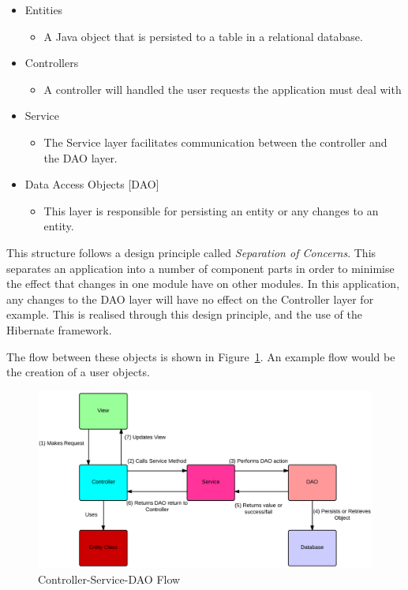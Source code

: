\begin{table}[H]
\begin{itemize}
\item Entities
\begin{itemize}
\item A Java object that is persisted to a table in a relational database.
\end{itemize}
\item Controllers
\begin{itemize}
\item A controller will handled the user requests the application must deal with
\end{itemize}
\item Service
\begin{itemize}
\item The Service layer facilitates communication between the controller and the DAO layer.
\end{itemize}
\item Data Access Objects [DAO]
\begin{itemize}
\item This layer is responsible for persisting an entity or any changes to an entity.
\end{itemize}
\end{itemize}
\label{fig:appbreakdown}
\end{table}

This structure follows a design principle called \textit{Separation of Concerns}. This separates an application into a number of component parts in order to minimise the effect that changes in one module have on other modules. In this application, any changes to the DAO layer will have no effect on the Controller layer for example. This is realised through this design principle, and the use of the Hibernate framework.

The flow between these objects is shown in Figure~\ref{fig:csdao}. An example flow would be the creation of a user objects. 

\begin{figure}[H]
\begin{center}
\includegraphics[width=14cm]{csdao.png}
\end{center}
\caption{Controller-Service-DAO Flow}
\label{fig:csdao}
\end{figure}

